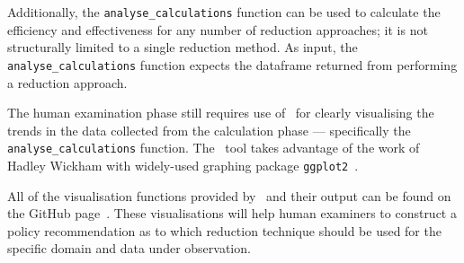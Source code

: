 Additionally, the \texttt{analyse\_calculations} function can be used to calculate the
efficiency and effectiveness for any number of reduction approaches; it is not structurally
limited to a single reduction method. As input, the \texttt{analyse\_calculations} function
expects the dataframe returned from performing a reduction approach.

The human examination phase still requires use of \mr~for clearly visualising the trends
in the data collected from the calculation phase --- specifically the \texttt{analyse\_calculations}
function. The \mr~tool takes advantage of the work of Hadley Wickham with widely-used
graphing package \texttt{ggplot2}~\cite{ggplot2}.

All of the visualisation functions provided by \mr~and their output can be found on the GitHub
page~\cite{tool}. These visualisations will help human examiners to construct a policy recommendation
as to which reduction technique should be used for the specific domain and data under observation.
